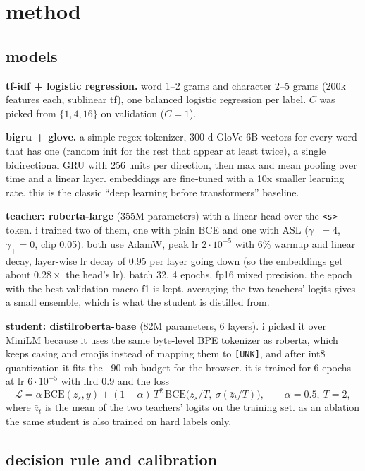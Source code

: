 \section{method}

\subsection{models}

\textbf{tf-idf + logistic regression.} word 1--2 grams and character 2--5 grams (200k features each, sublinear
tf), one balanced logistic regression per label. $C$ was picked from $\{1, 4, 16\}$ on validation ($C=1$).

\textbf{bigru + glove.} a simple regex tokenizer, 300-d GloVe 6B vectors \cite{glove} for every word that has
one (random init for the rest that appear at least twice), a single bidirectional GRU with 256 units per
direction, then max and mean pooling over time and a linear layer. embeddings are fine-tuned with a 10x
smaller learning rate. this is the classic ``deep learning before transformers'' baseline.

\textbf{teacher: roberta-large} \cite{roberta} (355M parameters) with a linear head over the \texttt{<s>}
token. i trained two of them, one with plain BCE and one with ASL ($\gamma_-=4$, $\gamma_+=0$, clip 0.05).
both use AdamW, peak lr $2\cdot10^{-5}$ with 6\% warmup and linear decay, layer-wise lr decay of 0.95 per
layer going down (so the embeddings get about $0.28\times$ the head's lr), batch 32, 4 epochs, fp16 mixed
precision. the epoch with the best validation macro-f1 is kept. averaging the two teachers' logits gives a
small ensemble, which is what the student is distilled from.

\textbf{student: distilroberta-base} \cite{distilbert} (82M parameters, 6 layers). i picked it over MiniLM
because it uses the same byte-level BPE tokenizer as roberta, which keeps casing and emojis instead of
mapping them to \texttt{[UNK]}, and after int8 quantization it fits the ~90 mb budget for the browser. it is
trained for 6 epochs at lr $6\cdot10^{-5}$ with llrd 0.9 and the loss
\[
  \mathcal{L} = \alpha\,\mathrm{BCE}(z_s, y) + (1-\alpha)\,T^2\,\mathrm{BCE}\big(z_s/T,\ \sigma(\bar z_t/T)\big),
  \qquad \alpha = 0.5,\ T = 2,
\]
where $\bar z_t$ is the mean of the two teachers' logits on the training set. as an ablation the same student
is also trained on hard labels only.

\subsection{decision rule and calibration}

